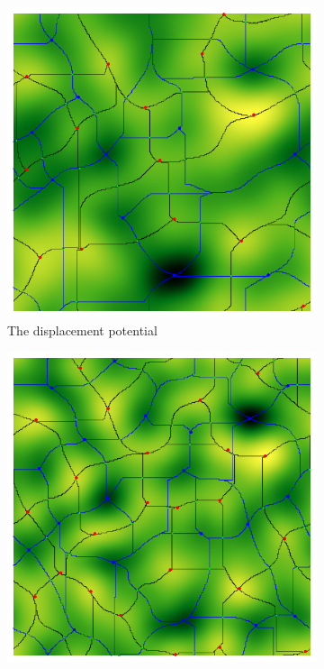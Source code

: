 \documentclass[a4paper, 11pt]{article}
\begin{document}
\begin{figure}
\centering
\begin{subfigure}[b]{0.32\textwidth}
\includegraphics[width=\textwidth]{Visual_GRF}
\caption{The displacement potential}
\label{fig:GRF_MS}
\end{subfigure}
\begin{subfigure}[b]{0.32\textwidth}
\includegraphics[width=\textwidth]{Visual_dens}

\end{subfigure}
\end{figure}
\end{document}
